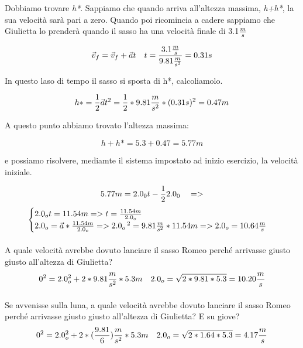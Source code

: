 Dobbiamo trovare \textit{h*}. Sappiamo che quando arriva all'altezza massima, \textit{h+h*}, la sua velocità sarà pari a zero. Quando poi ricomincia a cadere sappiamo che Giulietta lo prenderà quando il sasso ha una velocità finale di 3.1$\frac{m}{s}$

\begin{equation*}
    \vec{v}_f = \vec{v}_f + \vec{a}t \quad t = \frac{3.1\frac{m}{s}}{9.81\frac{m}{s^2}} = 0.31s
\end{equation*}

In questo laso di tempo il sasso si sposta di h*, calcoliamolo.

\begin{equation*}
    h* = \frac{1}{2}\vec{a} t^2 = \frac{1}{2}*9.81\frac{m}{s^2}*(0.31s)^2 = 0.47m
\end{equation*}

A questo punto abbiamo trovato l'altezza massima: 

\begin{equation*}
    h + h* = 5.3+0.47 = 5.77m
\end{equation*}

e possiamo risolvere, mediamte il sistema impostato ad inizio esercizio, la velocità iniziale.

\begin{equation*}
    5.77m = 2.0_0t-\frac{1}{2}2.0_0\quad{} => 
\end{equation*}
$$
\begin{cases}
    2.0_o t = 11.54m => t=\frac{11.54m}{2.0_o}\\
    2.0_o = \vec{a}*\frac{11.54m}{2.0_o} => 2.0_o\,^2 = 9.81\frac{m}{s^2}*11.54m => 2.0_o = 10.64\frac{m}{s}
\end{cases}
$$

\paragraph{}
A quale velocità avrebbe dovuto lanciare il sasso Romeo perché arrivasse giusto giusto all'altezza di Giulietta?
\begin{equation*}
    0^2 = 2.0_o ^2 + 2*9.81\frac{m}{s^2}*5.3m \quad 2.0_o = \sqrt{2*9.81*5.3} = 10.20\frac{m}{s}
\end{equation*}

\paragraph{}
Se avvenisse sulla luna, a quale velocità avrebbe dovuto lanciare il sasso Romeo perché arrivasse giusto giusto all'altezza di Giulietta? E su giove?
\begin{equation*}
    0^2 = 2.0_o ^2 + 2*(\frac{9.81}{6})\frac{m}{s^2}*5.3m \quad 2.0_o = \sqrt{2*1.64*5.3} = 4.17\frac{m}{s}\\
\end{equation*}

